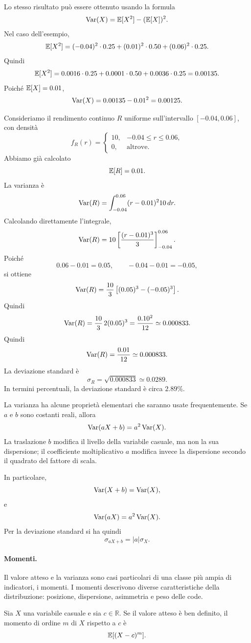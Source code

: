 Lo stesso risultato pu\`{o} essere ottenuto usando la formula
\[
\operatorname{Var}(X)=\mathbb{E}[X^2]-(\mathbb{E}[X])^2.
\]
Nel caso dell'esempio,
\[
\mathbb{E}[X^2]
=
(-0.04)^2\cdot 0.25
+
(0.01)^2\cdot 0.50
+
(0.06)^2\cdot 0.25.
\]
Quindi
\[
\mathbb{E}[X^2]
=
0.0016\cdot 0.25
+
0.0001\cdot 0.50
+
0.0036\cdot 0.25
=
0.00135.
\]
Poich\'{e} $\mathbb{E}[X]=0.01$,
\[
\operatorname{Var}(X)
=
0.00135-0.01^2
=
0.00125.
\]

\begin{example}
Consideriamo il rendimento continuo $R$ uniforme sull'intervallo
$[-0.04,0.06]$, con densit\`{a}
\[
f_R(r)=
\begin{cases}
10, & -0.04\leq r\leq 0.06,\\
0, & \mbox{altrove}.
\end{cases}
\]
Abbiamo gi\`{a} calcolato
\[
\mathbb{E}[R]=0.01.
\]
La varianza \`{e}
\[
\operatorname{Var}(R)
=
\int_{-0.04}^{0.06}(r-0.01)^2 10\,dr.
\]
Calcolando direttamente l'integrale,
\[
\operatorname{Var}(R)
=
10\left[\frac{(r-0.01)^3}{3}\right]_{-0.04}^{0.06}.
\]
Poich\'{e}
\[
0.06-0.01=0.05,
\qquad
-0.04-0.01=-0.05,
\]
si ottiene
\[
\operatorname{Var}(R)
=
\frac{10}{3}
\left[
(0.05)^3-(-0.05)^3
\right].
\]
Quindi
\[
\operatorname{Var}(R)
=
\frac{10}{3}\,2(0.05)^3
=
\frac{0.10^2}{12}
\simeq
0.000833.
\]
Quindi
\[
\operatorname{Var}(R)
=
\frac{0.01}{12}
\simeq
0.000833.
\]
La deviazione standard \`{e}
\[
\sigma_R
=
\sqrt{0.000833}
\simeq
0.0289.
\]
In termini percentuali, la deviazione standard \`{e} circa $2.89\%$.
\end{example}

La varianza ha alcune propriet\`{a} elementari che saranno usate frequentemente.
Se $a$ e $b$ sono costanti reali, allora
\[
\operatorname{Var}(aX+b)
=
a^2\operatorname{Var}(X).
\]
La traslazione $b$ modifica il livello della variabile casuale, ma non la sua
dispersione; il coefficiente moltiplicativo $a$ modifica invece la dispersione
secondo il quadrato del fattore di scala.

In particolare,
\[
\operatorname{Var}(X+b)=\operatorname{Var}(X),
\]
e
\[
\operatorname{Var}(aX)=a^2\operatorname{Var}(X).
\]
Per la deviazione standard si ha quindi
\[
\sigma_{aX+b}=|a|\sigma_X.
\]

\paragraph{Momenti.}
Il valore atteso e la varianza sono casi particolari di una classe pi\`{u} ampia
di indicatori, i momenti. I momenti descrivono diverse caratteristiche della
distribuzione: posizione, dispersione, asimmetria e peso delle code.

\begin{definition}
Sia $X$ una variabile casuale e sia $c\in\mathbb{R}$. Se il valore atteso \`{e}
ben definito, il momento di ordine $m$ di $X$ rispetto a $c$ \`{e}
\[
\mathbb{E}[(X-c)^m].
\]
\end{definition}

